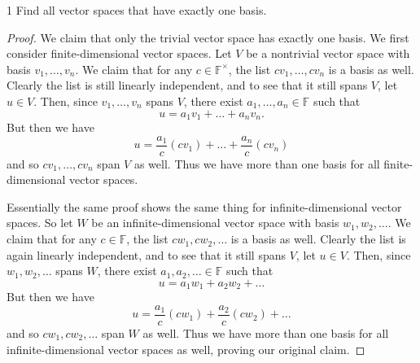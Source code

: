 \documentclass{extarticle}
\newenvironment{problem}[1]{\begin{prob*}{#1}{}}{\end{prob*}}
\newcommand{\F}{\mathbb{F}}
\begin{document}
\begin{problem}{1}
Find all vector spaces that have exactly one basis.
\end{problem}
\begin{proof}
We claim that only the trivial vector space has exactly one basis.  We first consider finite-dimensional vector spaces.  Let $V$ be a nontrivial vector space with basis $v_1,\dots, v_n$.  We claim that for any $c\in\F^\times$, the list $cv_1, \dots, cv_n$ is a basis as well.  Clearly the list is still linearly independent, and to see that it still spans $V$, let $u\in V$.  Then, since $v_1,\dots, v_n$ spans $V$, there exist $a_1,\dots, a_n\in\F$ such that 
\begin{equation*}
u = a_1v_1 + \dots + a_nv_n.
\end{equation*}  
But then we have
\begin{equation*}
u = \frac{a_1}{c}(cv_1) + \dots + \frac{a_n}{c}(cv_n)
\end{equation*}
and so $cv_1,\dots,cv_n$ span $V$ as well.  Thus we have more than one basis for all finite-dimensional vector spaces.
\par Essentially the same proof shows the same thing for infinite-dimensional vector spaces.  So let $W$ be an infinite-dimensional vector space with basis $w_1,w_2,\dots$.  We claim that for any $c\in\F$, the list $cw_1,cw_2,\dots$ is a basis as well.  Clearly the list is again linearly independent, and to see that it still spans $V$, let $u\in V$.  Then, since $w_1,w_2,\dots$ spans $W$, there exist $a_1, a_2,\dots \in \F$ such that
\begin{equation*}
u = a_1w_1 + a_2w_2 + \dots
\end{equation*}
But then we have
\begin{equation*}
u = \frac{a_1}{c}(cw_1) + \frac{a_2}{c}(cw_2) + \dots
\end{equation*}
and so $cw_1, cw_2,\dots$ span $W$ as well.  Thus we have more than one basis for all infinite-dimensional vector spaces as well, proving our original claim.
\end{proof}
\end{document}
